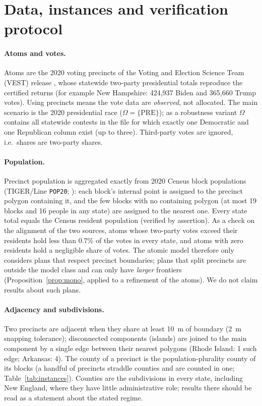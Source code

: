 \section{Data, instances and verification protocol}\label{sec:data}

\paragraph{Atoms and votes.}
Atoms are the 2020 voting precincts of the Voting and Election Science Team (VEST) release \citep{vest2021}, whose statewide two-party presidential totals reproduce the certified returns (for example New Hampshire: 424{,}937 Biden and 365{,}660 Trump votes). Using precincts means the vote data are \emph{observed}, not allocated. The main scenario is the 2020 presidential race ($\Omega=\{\mathrm{PRE}\}$); as a robustness variant $\Omega$ contains all statewide contests in the file for which exactly one Democratic and one Republican column exist (up to three). Third-party votes are ignored, i.e.\ shares are two-party shares.

\paragraph{Population.}
Precinct population is aggregated exactly from 2020 Census block populations (TIGER/Line \texttt{POP20}; \citealp{tiger2020}): each block's internal point is assigned to the precinct polygon containing it, and the few blocks with no containing polygon (at most 19 blocks and 16 people in any state) are assigned to the nearest one. Every state total equals the Census resident population (verified by assertion). As a check on the alignment of the two sources, atoms whose two-party votes exceed their residents hold less than 0.7\% of the votes in every state, and atoms with zero residents hold a negligible share of votes. The atomic model therefore only considers plans that respect precinct boundaries; plans that split precincts are outside the model class and can only have \emph{larger} frontiers (Proposition~\ref{prop:mono}, applied to a refinement of the atoms). We do not claim results about such plans.

\paragraph{Adjacency and subdivisions.}
Two precincts are adjacent when they share at least 10~m of boundary (2~m snapping tolerance); disconnected components (islands) are joined to the main component by a single edge between their nearest polygons (Rhode Island: 1 such edge; Arkansas: 4). The county of a precinct is the population-plurality county of its blocks (a handful of precincts straddle counties and are counted in one; Table~\ref{tab:instances}). Counties are the subdivisions in every state, including New England, where they have little administrative role; results there should be read as a statement about the stated regime.

